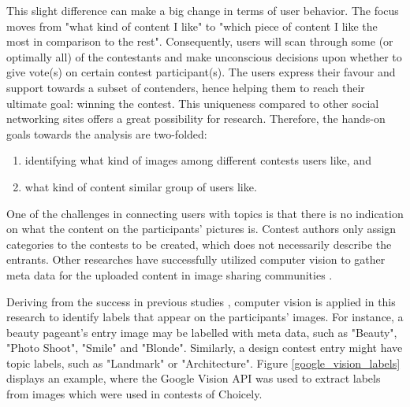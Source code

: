     This slight difference can make a big change in terms of user behavior. The focus moves from "what kind of content I like" to "which piece of content I like the most in comparison to the rest". Consequently, users will scan through some (or optimally all) of the contestants and make unconscious decisions upon whether to give vote(s) on certain contest participant(s). The users express their favour and support towards a subset of contenders, hence helping them to reach their ultimate goal: winning the contest. 
    This uniqueness compared to other social networking sites offers a great possibility for research. Therefore, the hands-on goals towards the analysis are two-folded: 

    \begin{enumerate}
        \item identifying what kind of images among different contests users like, and
        \item what kind of content similar group of users like.
    \end{enumerate}

    One of the challenges in connecting users with topics is that there is no indication on what the content on the participants' pictures is. Contest authors only assign categories to the contests to be created, which does not necessarily describe the entrants. Other researches have successfully utilized computer vision to gather meta data for the uploaded content in image sharing communities \cite{bakhshi2014faces, hu2014we}. 
    
    Deriving from the success in previous studies \cite{hu2014we, farseev2015harvestingmultiplesources, han2016teensarefrommars, bakhshi2014faces}, computer vision is applied in this research to identify labels that appear on the participants' images. For instance, a beauty pageant's entry image may be labelled with meta data, such as "Beauty", "Photo Shoot", "Smile" and "Blonde". Similarly, a design contest entry might have topic labels, such as "Landmark" or "Architecture". Figure \ref{google_vision_labels} displays an example, where the Google Vision API was used to extract labels from images which were used in contests of Choicely.

